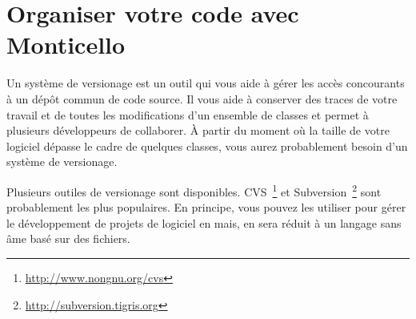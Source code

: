 \documentclass[a4paper,10pt,twoside]{book}
\begin{document}
	\renewcommand{\nnbb}[2]{} %
	\sloppy
\fi

\newcommand{\figlabel}[1]{\label{fig:#1}}
\newcommand{\seclabel}[1]{\label{sec:#1}}

\chapter{Organiser votre code avec Monticello}



\noindent
{}


Un syst\`eme de versionage est un outil qui vous aide \`a g\'erer les
acc\`es concourants \`a un d\'ep\^ot commun de code source. Il vous
aide \`a conserver des traces de votre travail et de toutes les
modifications d'un ensemble de classes et permet \`a plusieurs
d\'eveloppeurs de collaborer. \`A partir du moment o\`u la taille de
votre logiciel d\'epasse le cadre de quelques classes, vous aurez
probablement besoin d'un syst\`eme de versionage.

Plusieurs outiles de versionage sont
disponibles. CVS~\footnote{\url{http://www.nongnu.org/cvs}} et
Subversion~\footnote{\url{http://subversion.tigris.org}} sont
probablement les plus populaires.
En principe, vous pouvez les utiliser pour g\'erer le d\'eveloppement
de projets de logiciel en \sq mais, \sq en sera r\'eduit \`a un
langage sans \^ame bas\'e sur des fichiers.
 
\end{document}
